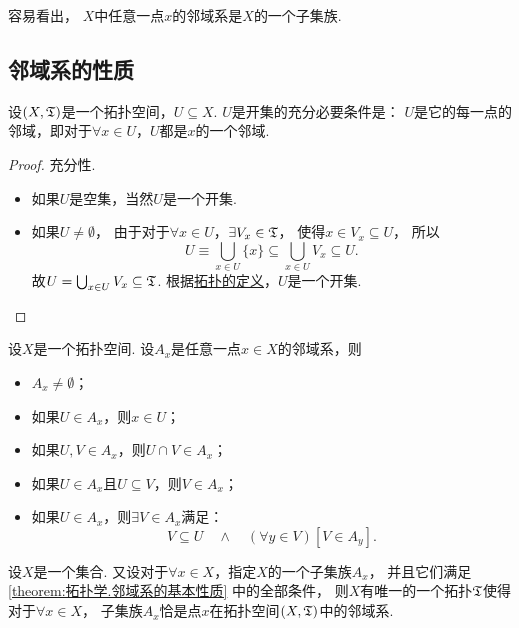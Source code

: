 容易看出，
\(X\)中任意一点\(x\)的邻域系是\(X\)的一个子集族.

\subsection{邻域系的性质}
\begin{theorem}\label{theorem:拓扑学.成为开集的充分必要条件1}
设\((X,\mathfrak T)\)是一个拓扑空间，\(U \subseteq X\).
\(U\)是开集的充分必要条件是：
\(U\)是它的每一点的邻域，即对于\(\forall x \in U\)，\(U\)都是\(x\)的一个邻域.
\begin{proof}
充分性.
\begin{itemize}
	\item 如果\(U\)是空集，当然\(U\)是一个开集.

	\item 如果\(U\neq\emptyset\)，
	由于对于\(\forall x \in U\)，\(\exists V_x \in \mathfrak T\)，
	使得\(x \in V_x \subseteq U\)，
	所以\[
	U \equiv \bigcup_{x \in U} \{ x \}
	\subseteq \bigcup_{x \in U} V_x
	\subseteq U.
	\]
	故\(U = \bigcup_{x \in U} V_x \subseteq \mathfrak T\).
	根据\hyperref[definition:拓扑学.开集公理定义的拓扑空间]{拓扑的定义}，\(U\)是一个开集.
	\qedhere
\end{itemize}
\end{proof}
\end{theorem}

\begin{theorem}\label{theorem:拓扑学.邻域系的基本性质}
设\(X\)是一个拓扑空间.
设\(A_x\)是任意一点\(x \in X\)的邻域系，则
\begin{itemize}
	\item \(A_x \neq \emptyset\)；
	\item 如果\(U \in A_x\)，则\(x \in U\)；
	\item 如果\(U,V \in A_x\)，则\(U \cap V \in A_x\)；
	\item 如果\(U \in A_x\)且\(U \subseteq V\)，则\(V \in A_x\)；
	\item 如果\(U \in A_x\)，则\(\exists V \in A_x\)满足：\[
		V \subseteq U
		\quad\land\quad
		(\forall y \in V)
		[V \in A_y].
	\]
\end{itemize}
\end{theorem}

\begin{theorem}\label{theorem:拓扑学.从邻域系出发定义拓扑}
设\(X\)是一个集合.
又设对于\(\forall x \in X\)，指定\(X\)的一个子集族\(A_x\)，
并且它们满足\cref{theorem:拓扑学.邻域系的基本性质} 中的全部条件，
则\(X\)有唯一的一个拓扑\(\mathfrak T\)使得对于\(\forall x \in X\)，
子集族\(A_x\)恰是点\(x\)在拓扑空间\((X,\mathfrak T)\)中的邻域系.
\end{theorem}

